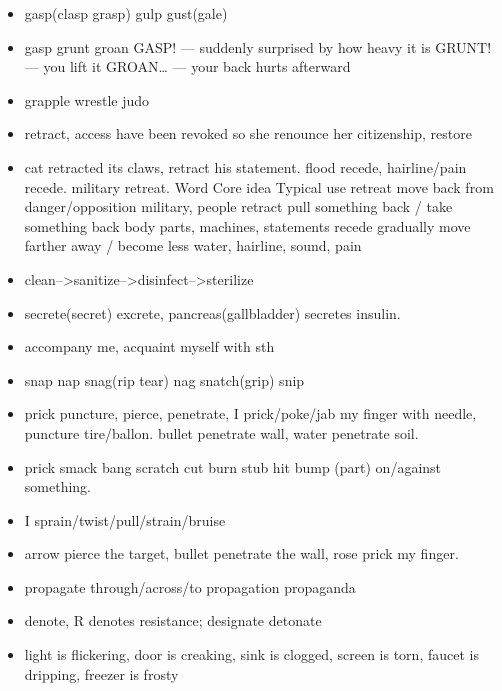 \documentclass[a4paper,11pt,twoside]{book}
\begin{document}
\begin{itemize}
	\item gasp(clasp grasp) gulp gust(gale)
	
	\item gasp grunt groan GASP! — suddenly surprised by how heavy it is  GRUNT! — you lift it  GROAN… — your back hurts afterward
	
	\item grapple wrestle judo
	
	\item retract, access have been revoked so she renounce her citizenship,  restore
	
	\item cat retracted its claws, retract his statement.  flood recede, hairline/pain recede. military retreat. 
	Word	Core idea	Typical use
	retreat	move back from danger/opposition	military, people
	retract	pull something back / take something back	body parts, machines, statements
	recede	gradually move farther away / become less	water, hairline, sound, pain
	
	\item clean-->sanitize-->disinfect-->sterilize
	
	\item secrete(secret) excrete, pancreas(gallbladder) secretes insulin.
	
	\item accompany me, acquaint myself with sth
	
	\item snap nap snag(rip tear) nag snatch(grip) snip
	
	\item prick puncture, pierce, penetrate, I prick/poke/jab my finger with needle, puncture tire/ballon. bullet penetrate wall, water penetrate soil. 
	
	\item prick smack bang scratch cut burn stub hit bump (part) on/against something. 
	
	\item I sprain/twist/pull/strain/bruise 
	
	\item arrow pierce the target, bullet penetrate the wall,  rose prick my finger.
		
	\item propagate through/across/to propagation propaganda
	
	\item denote, R denotes resistance;  designate detonate
	
	\item light is flickering, door is creaking, sink is clogged, screen is torn, faucet is dripping, freezer is frosty


\end{itemize}
\end{document}

